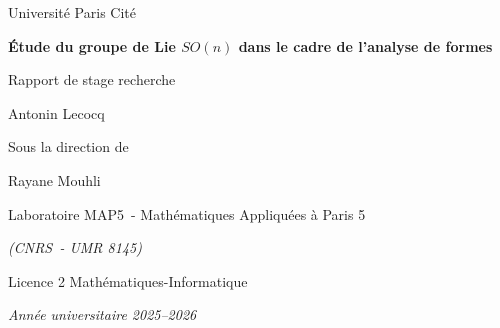 \newcommand{\titreMemoire}{Étude du groupe de Lie $SO(n)$ dans le cadre de l'analyse de formes}
\newcommand{\sousTitreMemoire}{Rapport de stage recherche}
\newcommand{\auteurMemoire}{Antonin Lecocq}
\newcommand{\directeurMemoire}{Rayane Mouhli}
\newcommand{\etablissement}{Université Paris Cité}
\newcommand{\labo}{Laboratoire MAP5~- Mathématiques Appliquées à Paris 5}
\newcommand{\laboComplement}{(CNRS~- UMR 8145)}

\begin{titlepage}

\begin{center}
\vspace{1.5 cm}
\end{center}

\begin{center}
{\Large\etablissement\par}
\vspace{2.5 cm}
\end{center}

\begin{center}
{\Huge \textbf{\titreMemoire} \par}
\vspace{0.5cm}
{\Large \sousTitreMemoire\par}
\end{center}

\vfill

\begin{center}
{\Large\auteurMemoire\par}
\Large Sous la direction de {\directeurMemoire\par}
\vspace{1.5cm}
\end{center}

\begin{center}
{\labo\par}
{\textit{\laboComplement}\par}
\end{center}

\vfill

\begin{center}
Licence 2 Mathématiques-Informatique
\end{center}

\begin{center}
\textit{Année universitaire 2025--2026}
\end{center}

\vspace{1.5cm}

\end{titlepage}
